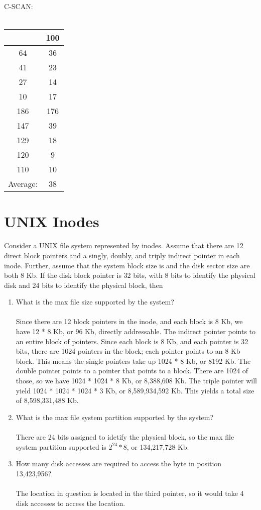 \documentclass{article}
\begin{document}
\begin{minipage}[t]{0.25\textwidth}
C-SCAN:\\\\
\begin{tabular}{c|c}
& 100\\
\hline
64 & 36\\
41 & 23\\
27 & 14\\
10 & 17\\
186 & 176\\
147 & 39\\
129 & 18\\
120 & 9\\
110 & 10\\
\hline
Average: & 38
\end{tabular}
\end{minipage}
\newpage



\section{UNIX Inodes}
Consider a UNIX file system represented by inodes.
Assume that there are 12 direct block pointers and a singly, doubly, and triply
indirect pointer in each inode.
Further, assume that the system block size is and the disk sector size are both
8 Kb.
If the disk block pointer is 32 bits, with 8 bits to identify the physical disk
and 24 bits to identify the physical block, then
\begin{enumerate}
\item What is the max file size supported by the system?\\\\
Since there are 12 block pointers in the inode, and each block is 8 Kb, we have
12 * 8 Kb, or 96 Kb, directly addressable.
The indirect pointer points to an entire block of pointers.
Since each block is 8 Kb, and each pointer is 32 bits, there are 1024 pointers
in the block; each pointer points to an 8 Kb block.
This means the single pointers take up 1024 * 8 Kb, or 8192 Kb.
The double pointer points to a pointer that points to a block.
There are 1024 of those, so we have 1024 * 1024 * 8 Kb, or 8,388,608 Kb.
The triple pointer will yield 1024 * 1024 * 1024 * 3 Kb, or 8,589,934,592 Kb.
This yields a total size of 8,598,331,488 Kb.
\item What is the max file system partition supported by the system?\\\\
There are 24 bits assigned to idetify the physical block, so the max file system
partition supported is $2^{24} * 8$, or 134,217,728 Kb.
\item How many disk accesses are required to access the byte in position 13,423,956?\\\\
The location in question is located in the third pointer, so it would take 4 disk
accesses to access the location.
\end{enumerate}
\end{document}
